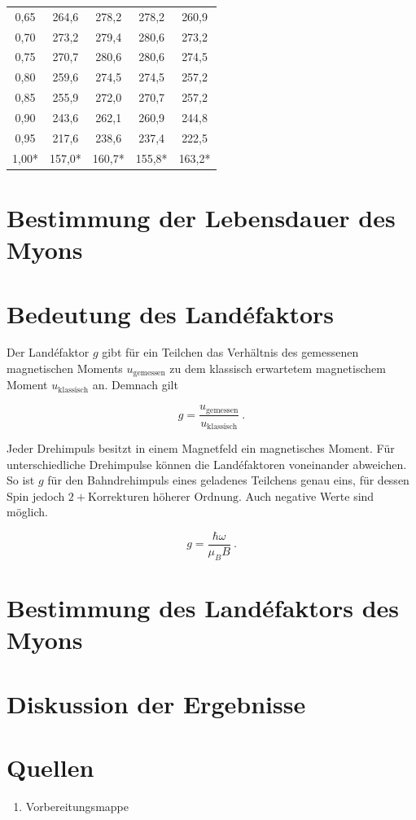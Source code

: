\documentclass[a4paper,ngerman]{scrartcl}
\begin{document}
\begin{table}[tb!]
\begin{tabular}{ccccc}
0,65 & 264,6 & 278,2 & 278,2 & 260,9 \\
0,70 & 273,2 & 279,4 & 280,6 & 273,2 \\
0,75 & 270,7 & 280,6 & 280,6 & 274,5 \\
0,80 & 259,6 & 274,5 & 274,5 & 257,2 \\
0,85 & 255,9 & 272,0 & 270,7 & 257,2 \\
0,90 & 243,6 & 262,1 & 260,9 & 244,8 \\
0,95 & 217,6 & 238,6 & 237,4 & 222,5 \\
1,00* & 157,0* & 160,7* & 155,8* & 163,2* \\
\bottomrule
\end{tabular}
\label{tab:fieldinhomogenities}
\end{table}








\section{Bestimmung der Lebensdauer des Myons}









\section{Bedeutung des Landéfaktors}

Der Landéfaktor $g$ gibt für ein Teilchen das Verhältnis des gemessenen magnetischen Moments $ u_{\mathrm{gemessen}}$ zu dem klassisch erwartetem magnetischem Moment $u_{\mathrm{klassisch}}$ an. Demnach gilt

\begin{equation}
g = \frac{ u_{\mathrm{gemessen}} }{u_{\mathrm{klassisch}} } ~.
\end{equation}

Jeder Drehimpuls besitzt in einem Magnetfeld ein magnetisches Moment. Für unterschiedliche Drehimpulse können die Landéfaktoren voneinander abweichen. So ist $g$ für den Bahndrehimpuls eines geladenes Teilchens genau eins, für dessen Spin jedoch $2 + \text{Korrekturen höherer Ordnung}$. Auch negative Werte sind möglich.

\begin{equation}
g = \frac{\hbar \omega}{\mu_B B} ~.
\end{equation}

\section{Bestimmung des Landéfaktors des Myons}




\section{Diskussion der Ergebnisse}




\section{Quellen}
\begin{enumerate}
\item Vorbereitungsmappe 
\end{enumerate}
\end{document}
